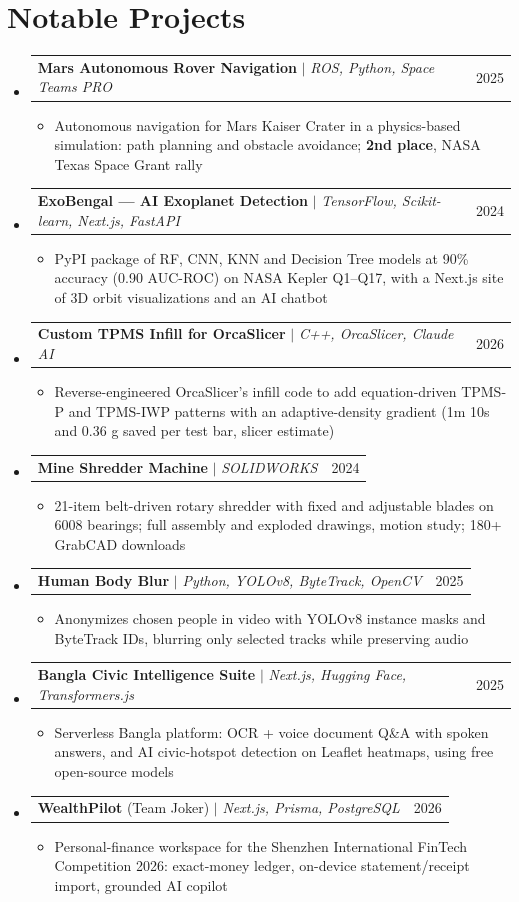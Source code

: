 \documentclass[letterpaper,11pt]{article}
\makeatletter
\newcommand{\resumeItem}[1]{\item\small{{#1 \vspace{-2pt}}}}
\newcommand{\resumeProjectHeading}[2]{
    \item
    \begin{tabular*}{0.97\textwidth}{l@{\extracolsep{\fill}}r}
      \small#1 & #2 \\
    \end{tabular*}\vspace{-7pt}
}
\newcommand{\resumeSubHeadingListStart}{\begin{itemize}[leftmargin=0.15in, label={}]}
\newcommand{\resumeSubHeadingListEnd}{\end{itemize}}
\newcommand{\resumeItemListStart}{\begin{itemize}}
\newcommand{\resumeItemListEnd}{\end{itemize}\vspace{-5pt}}
\makeatother
\begin{document}
\section{Notable Projects}
    \resumeSubHeadingListStart
      \resumeProjectHeading
          {\textbf{Mars Autonomous Rover Navigation} $|$ \emph{ROS, Python, Space Teams PRO}}{2025}
          \resumeItemListStart
            \resumeItem{Autonomous navigation for Mars Kaiser Crater in a physics-based simulation: path planning and obstacle avoidance; \textbf{2nd place}, NASA Texas Space Grant rally}
          \resumeItemListEnd
      \resumeProjectHeading
          {\textbf{ExoBengal --- AI Exoplanet Detection} $|$ \emph{TensorFlow, Scikit-learn, Next.js, FastAPI}}{2024}
          \resumeItemListStart
            \resumeItem{PyPI package of RF, CNN, KNN and Decision Tree models at 90\% accuracy (0.90 AUC-ROC) on NASA Kepler Q1--Q17, with a Next.js site of 3D orbit visualizations and an AI chatbot}
          \resumeItemListEnd
      \resumeProjectHeading
          {\textbf{Custom TPMS Infill for OrcaSlicer} $|$ \emph{C++, OrcaSlicer, Claude AI}}{2026}
          \resumeItemListStart
            \resumeItem{Reverse-engineered OrcaSlicer's infill code to add equation-driven TPMS-P and TPMS-IWP patterns with an adaptive-density gradient (1m 10s and 0.36 g saved per test bar, slicer estimate)}
          \resumeItemListEnd
      \resumeProjectHeading
          {\textbf{Mine Shredder Machine} $|$ \emph{SOLIDWORKS}}{2024}
          \resumeItemListStart
            \resumeItem{21-item belt-driven rotary shredder with fixed and adjustable blades on 6008 bearings; full assembly and exploded drawings, motion study; 180+ GrabCAD downloads}
          \resumeItemListEnd
      \resumeProjectHeading
          {\textbf{Human Body Blur} $|$ \emph{Python, YOLOv8, ByteTrack, OpenCV}}{2025}
          \resumeItemListStart
            \resumeItem{Anonymizes chosen people in video with YOLOv8 instance masks and ByteTrack IDs, blurring only selected tracks while preserving audio}
          \resumeItemListEnd
      \resumeProjectHeading
          {\textbf{Bangla Civic Intelligence Suite} $|$ \emph{Next.js, Hugging Face, Transformers.js}}{2025}
          \resumeItemListStart
            \resumeItem{Serverless Bangla platform: OCR + voice document Q\&A with spoken answers, and AI civic-hotspot detection on Leaflet heatmaps, using free open-source models}
          \resumeItemListEnd
      \resumeProjectHeading
          {\textbf{WealthPilot} (Team Joker) $|$ \emph{Next.js, Prisma, PostgreSQL}}{2026}
          \resumeItemListStart
            \resumeItem{Personal-finance workspace for the Shenzhen International FinTech Competition 2026: exact-money ledger, on-device statement/receipt import, grounded AI copilot}
          \resumeItemListEnd
    \resumeSubHeadingListEnd
\end{document}
